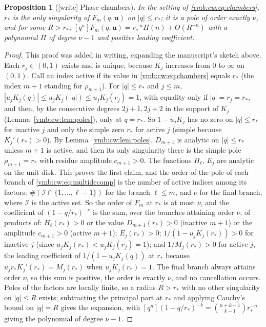 \documentclass[11pt,a4paper]{article}
\numberwithin{equation}{section}
\newtheorem{proposition}[theorem]{Proposition}
\theoremstyle{definition}\newtheorem{definition}[theorem]{Definition}
\theoremstyle{remark}\newtheorem{remark}[theorem]{Remark}
\newcommand{\coeff}[2]{[#1^{#2}]}
\begin{document}
\begin{proposition}[{[write]} Phase chambers]\label{vmb:cw:prop:chambers}
In the setting of \eqref{vmb:cw:eq:chambers}, $r_*$ is the only singularity
of $F_m(q,\bm u)$ on $|q|\le r_*$; it is a pole of order exactly $\nu$, and
for some $R>r_*$,
$\coeff qn F_m(q,\bm u)=r_*^{-n}\Pi(n)+O(R^{-n})$ with a polynomial $\Pi$ of
degree $\nu-1$ and positive leading coefficient.
\end{proposition}
\begin{proof}
This proof was added in writing, expanding the manuscript's sketch above.
Each $r_j\in(0,1)$ exists and is unique, because $K_j$ increases from $0$ to
$\infty$ on $(0,1)$. Call an index active if its value in
\eqref{vmb:cw:eq:chambers} equals $r_*$ (the index $m+1$ standing for
$\rho_{m+1}$). For $|q|\le r_*$ and $j\le m$,
$|u_jK_j(q)|\le u_jK_j(|q|)\le u_jK_j(r_j)=1$, with equality only if
$|q|=r_j=r_*$, and then, by the consecutive degrees $2j+1,2j+2$ in the
support of $K_j$ (Lemma~\ref{vmb:cw:lem:poles}), only at $q=r_*$. So $1-u_jK_j$
has no zero on $|q|\le r_*$ for inactive $j$ and only the simple zero $r_*$
for active $j$ (simple because $K_j'(r_*)>0$). By
Lemma~\ref{vmb:cw:lem:poles}, $D_{m+1}$ is analytic on $|q|\le r_*$ unless
$m+1$ is active, and then its only singularity there is the simple pole
$\rho_{m+1}=r_*$ with residue amplitude $c_{m+1}>0$. The functions $H_\ell$,
$E_j$ are analytic on the unit disk. This proves the first claim, and the
order of the pole of each branch of \eqref{vmb:cw:eq:multidecomp} is the
number of active indices among its factors: $\#(\mathcal I\cap\{1,\ldots,\ell-1\})$
for the branch $\ell\le m$, and $\nu$ for the final branch, where
$\mathcal I$ is the active set. So the order of $F_m$ at $r_*$ is at most
$\nu$, and the coefficient of $(1-q/r_*)^{-\nu}$ is the sum, over the branches
attaining order $\nu$, of products of: $H_\ell(r_*)>0$ or the value
$D_{m+1}(r_*)>0$ (inactive $m+1$) or the amplitude $c_{m+1}>0$ (active
$m+1$); $E_j(r_*)>0$; $1/(1-u_jK_j(r_*))>0$ for inactive $j$ (since
$u_jK_j(r_*)<u_jK_j(r_j)=1$); and $1/M_j(r_*)>0$ for active $j$, the
leading coefficient of $1/(1-u_jK_j(q))$ at $r_*$ because
$u_jr_*K_j'(r_*)=M_j(r_*)$ when $u_jK_j(r_*)=1$. The final branch always
attains order $\nu$, so this sum is positive, the order is exactly $\nu$,
and no cancellation occurs. Poles of the factors are locally finite, so a
radius $R>r_*$ with no other singularity on $|q|\le R$ exists; subtracting
the principal part at $r_*$ and applying Cauchy's bound on $|q|=R$ gives the
expansion, with $\coeff qn(1-q/r_*)^{-k}=\binom{n+k-1}{k-1}r_*^{-n}$ giving
the polynomial of degree $\nu-1$.
\end{proof}
\end{document}
